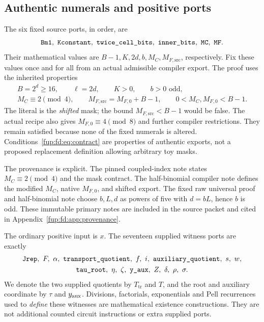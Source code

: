 \documentclass[11pt,letterpaper]{article}
\theoremstyle{definition}\newtheorem{definition}[theorem]{Definition}
\theoremstyle{remark}\newtheorem{remark}[theorem]{Remark}
\newcommand{\code}[1]{\texttt{\detokenize{#1}}}
\newcommand{\MC}{M_C}
\newcommand{\MFsrcV}{M_{F,\mathrm{src}}}
\newcommand{\MFnatV}{M_{F,0}}
\newcommand{\tr}{T_{\mathrm{tr}}}\newcommand{\ma}{m_{\mathrm{aux}}}
\begin{document}
\subsection{Authentic numerals and positive ports}
The six fixed source ports, in order, are
\[
 \code{Bm1},\ \code{Kconstant},\ \code{twice_cell_bits},\
 \code{inner_bits},\ \code{MC},\ \code{MF}.
\]
Their mathematical values are $B-1,K,2d,b,\MC,\MFsrcV$, respectively. Fix these values once and for all from an actual admissible compiler export. The proof uses the inherited properties
\begin{equation}\label{fup:fd:eq:contract}
 \begin{gathered}
 B=2^d\ge16,\qquad \ell=2d,\qquad K>0,\qquad b>0\text{ odd},\\
 \MC\equiv2\pmod4,\qquad \MFsrcV=\MFnatV+B-1,\qquad
 0<\MC,\MFnatV<B-1.
 \end{gathered}
\end{equation}
The literal \code{MF} is the \emph{shifted} mask; the bound $\MFsrcV<B-1$ would be false. The actual recipe also gives $\MFnatV\equiv4\pmod8$ and further compiler restrictions. They remain satisfied because none of the fixed numerals is altered. Conditions~\eqref{fup:fd:eq:contract} are properties of authentic exports, not a proposed replacement definition allowing arbitrary toy masks.

The provenance is explicit. The pinned coupled-index note states $\MC\equiv2\pmod4$ and the mask contract. The half-binomial compiler note defines the modified $\MC$, native $\MFnatV$, and shifted export. The fixed raw universal proof and half-binomial note choose $b,L,d$ as powers of five with $d=bL$, hence $b$ is odd. These immutable primary notes are included in the source packet and cited in Appendix~\ref{fup:fd:app:provenance}.

The ordinary positive input is $x$. The seventeen supplied witness ports are exactly
\begin{equation}\label{fup:fd:eq:ports}
 \begin{gathered}
 \code{Jrep},\ F,\ \alpha,\ \code{transport_quotient},\ f,\ i,
 \ \code{auxiliary_quotient},\ s,\ w,\\
 \code{tau_root},\ \eta,\ \zeta,\ \code{y_aux},\ Z,\ \delta,\ \rho,\ \sigma.
 \end{gathered}
\end{equation}
We denote the two supplied quotients by $\tr$ and $T$, and the root and auxiliary coordinate by $\tau$ and $y_{\mathrm{aux}}$. Divisions, factorials, exponentials and Pell recurrences used to \emph{define} these witnesses are mathematical existence constructions. They are not additional counted circuit instructions or extra supplied ports.
\end{document}
